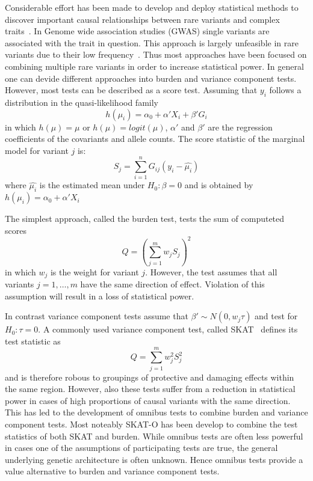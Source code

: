 Considerable effort has been made to develop and deploy statistical methods to discover important causal relationships between rare variants and complex traits~\cite{Morris2010,Zeng2014,Daye2012,Manuscript2013}.
In Genome wide association studies (GWAS) single variants are associated with the trait in question.
This approach is largely unfeasible in rare variants due to their low frequency~\cite{Lee2014}.
Thus most approaches have been focused on combining multiple rare variants in order to increase statistical power.
In general one can devide different approaches into burden and variance component tests.
However, most tests can be described as a score test.
Assuming that $y_i$ follows a distribution in the quasi-likelihood family~\cite{Lee2014}
\begin{equation}
  h(\mu_i) = \alpha_0 + \alpha'X_i +\beta'G_i
\end{equation}
in which $h(\mu) = \mu$ or $h(\mu) = logit(\mu)$, $\alpha'$ and $\beta'$ are the regression coefficients of the covariants and allele counts.
The score statistic of the marginal model for variant $j$ is:
\begin{equation}
  S_j = \sum^n_{i=1} G_{ij}(y_i-\hat{\mu_i})
\end{equation}
where $\hat{\mu_i}$ is the estimated mean under $H_0: \beta = 0 $ and is obtained by $h(\mu_i) = \alpha_0 + \alpha'X_i$

The simplest approach, called the burden test, tests the sum of computeted scores
\begin{equation}\label{eq:burden}
  Q = {(\sum^{m}_{j=1} w_{j} S_{j})}^2
\end{equation}
in which $w_j$ is the weight for variant $j$.
However, the test assumes that all variants $j = 1, \ldots,m$ have the same direction of effect.
Violation of this assumption will result in a loss of statistical power.

In contrast variance component tests assume that $\beta'\sim N(0,w_j\tau)$ and test for $H_0: \tau = 0$.
A commonly used variance component test, called SKAT~\cite{Lee2014} defines its test statistic as
\begin{equation}\label{eq:skat}
  Q = \sum^{m}_{j=1} w_{j}^2 S_{j}^2
\end{equation}
and is therefore robous to groupings of protective and damaging effects within the same region.
However, also these tests suffer from a reduction in statistical power in cases of high proportions of causal variants with the same direction.
This has led to the development of omnibus tests to combine burden and variance component tests.
Most noteably SKAT-O has been develop to combine the test statistics of both SKAT and burden.
While omnibus tests are often less powerful in cases one of the assumptions of participating tests are true, the general underlying genetic architecture is often unknown.
Hence omnibus tests provide a value alternative to burden and variance component tests.


